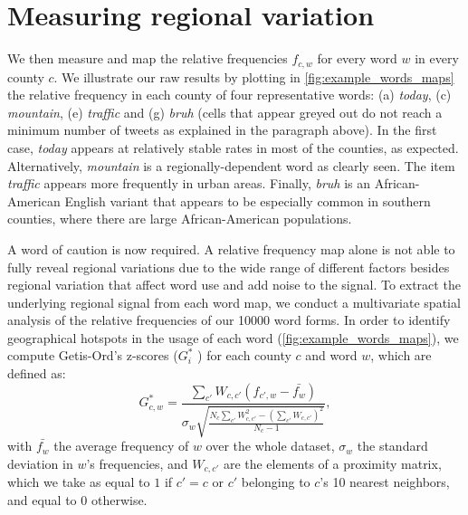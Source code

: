 \documentclass[../thesis.tex]{subfiles}
\begin{document}
\section{Measuring regional variation}

We then measure and map the relative frequencies $f_{c, w}$ for every word $w$ in every
county $c$. We illustrate our raw results by plotting in \cref{fig:example_words_maps}
the relative frequency in each county of four representative words: (a) \textit{today},
(c) \textit{mountain}, (e) \textit{traffic} and (g) \textit{bruh} (cells that appear
greyed out do not reach a minimum number of tweets as explained in the paragraph above).
In the first case, \textit{today} appears at relatively stable rates in most of the
counties, as expected. Alternatively, \textit{mountain} is a regionally-dependent word
as clearly seen. The item \textit{traffic} appears more frequently in urban areas.
Finally, \textit{bruh} is an African-American English variant that appears to be
especially common in southern counties, where there are large African-American
populations.

A word of caution is now required. A relative frequency map alone is not able to fully
reveal regional variations due to the wide range of different factors besides regional
variation that affect word use and add noise to the signal. To extract the underlying
regional signal from each word map, we conduct a multivariate spatial analysis
\cite{GrieveStatisticalMethod2011,GrieveRegionalVariation2016} of the relative
frequencies of our \SI{10000}{} word forms. In order to identify geographical hotspots
in the usage of each word (\cref{fig:example_words_maps}), we compute Getis-Ord's
z-scores ($G_i^*$ \cite{OrdLocalSpatial1995}) for each county $c$ and word $w$, which
are defined as:
\begin{equation}
\label{eq:Gi_star}
  G_{c, w}^* = \frac{
      \sum_{c'} W_{c, c'} (f_{c', w} - \bar{f_w})
    }{
      \sigma_w \sqrt{\frac{
        N_c \sum_{c'} W_{c, c'}^2
          - \left( \sum_{c'} W_{c, c'} \right)^2
        }{
          N_c - 1
        }
      }
    },
\end{equation}
with $\bar{f_w}$ the average frequency of $w$ over the whole dataset, $\sigma_w$ the
standard deviation in $w$'s frequencies, and $W_{c, c'}$ are the elements of a proximity
matrix, which we take as equal to $1$ if $c' = c$ or $c'$ belonging to $c$'s 10 nearest
neighbors, and equal to $0$ otherwise.
\end{document}
